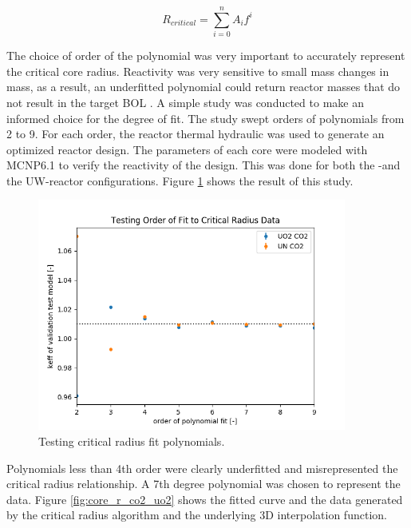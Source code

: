 \begin{equation}
    R_{critical} = \sum_{i=0}^n A_if^i
    \label{eq:polyfit}
\end{equation}

The choice of order of the polynomial was very important to accurately represent the
critical core radius. Reactivity was very sensitive to small mass changes in mass, as
a result, an underfitted polynomial could return reactor masses that do not
result in the target BOL \keff. A simple study was conducted to make an informed
choice for the degree of fit. The study swept orders of polynomials from 2 to 9.
For each order, the reactor thermal hydraulic was used to generate an optimized reactor
design. The parameters of each core were modeled with MCNP6.1 to verify the
reactivity of the design. This was done for both the \uox-\codiox and
the UW-\codiox reactor configurations. Figure \ref{fig:fit_order_test} shows the
result of this study.

\begin{figure}[h]
    \centering
    \includegraphics[width=4in]{../images/poly_order_test.png}
\caption{Testing critical radius fit polynomials.}
\label{fig:fit_order_test}
\end{figure}

Polynomials less than 4th order were clearly underfitted and misrepresented the
critical radius relationship. A 7th degree polynomial was chosen to represent the
data. Figure \ref{fig:core_r_co2_uo2} shows the fitted curve and the
data generated by the critical radius algorithm and the underlying 3D
interpolation function.

